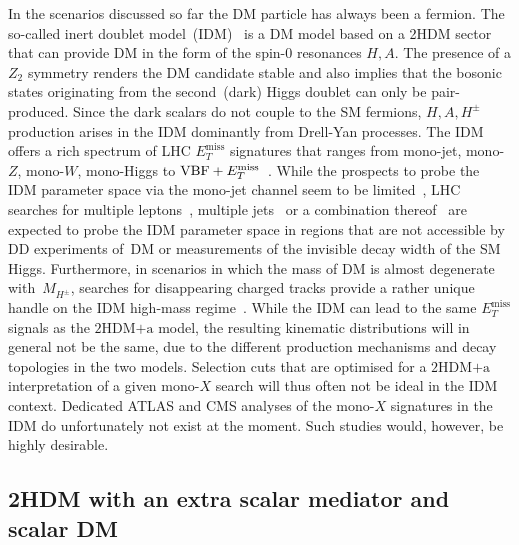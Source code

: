 \documentclass[a4paper, 11pt,notoc]{article}
\newcommand{\MET}{\ensuremath{E_T^\mathrm{miss}}\xspace}
\newcommand{\hdma}{\ensuremath{\textrm{2HDM+a}}\xspace}
\begin{document}
In the scenarios discussed so far the DM particle has always been a fermion. The so-called inert doublet model~(IDM)~\cite{Deshpande:1977rw,Barbieri:2006dq,Cao:2007rm} is a DM model based on a 2HDM sector that can provide DM in the form of the spin-0 resonances $H, A$.  The presence of a $Z_2$ symmetry renders the DM candidate stable and also implies  that the bosonic states originating from the second~(dark) Higgs doublet can only be pair-produced. Since the dark scalars do not couple to the SM fermions, $H,A,H^\pm$ production arises in the IDM dominantly from Drell-Yan processes. The IDM offers a rich spectrum of LHC $\MET$ signatures that ranges from mono-jet, mono-$Z$, mono-$W$, mono-Higgs to  ${\rm VBF}+\MET$~\cite{Dolle:2009ft,Miao:2010rg,Gustafsson:2012aj,Belanger:2015kga,Ilnicka:2015jba,Poulose:2016lvz,Datta:2016nfz,Hashemi:2016wup,deFlorian:2016spz,Belyaev:2016lok,Dutta:2017lny,Wan:2018eaz}.  While the prospects to probe the IDM parameter space via the mono-jet channel seem to be limited~\cite{Belyaev:2016lok}, LHC searches for multiple leptons~\cite{Dolle:2009ft,Miao:2010rg,Gustafsson:2012aj,Belanger:2015kga,Datta:2016nfz,Hashemi:2016wup}, multiple jets~\cite{Poulose:2016lvz,Dutta:2017lny}  or a combination thereof~\cite{Hashemi:2016wup,Wan:2018eaz} are expected to probe the IDM parameter space in regions that are not accessible by DD experiments of~DM or measurements of the invisible decay width of the SM Higgs. Furthermore, in scenarios in which the mass of DM is almost degenerate with~$M_{H^\pm}$, searches for disappearing charged tracks provide a rather unique handle on the IDM high-mass regime~\cite{Belyaev:2016lok}. While the IDM can lead to the same $\MET$ signals  as the \hdma model, the resulting kinematic distributions will in general not be the same, due to the different production mechanisms and decay topologies in the two models. Selection cuts that are optimised for a \hdma interpretation of a given mono-$X$ search will thus often not be ideal in the IDM context. Dedicated ATLAS and CMS  analyses of the mono-$X$ signatures in the IDM do unfortunately not exist at the moment. Such studies would, however, be highly desirable.

\subsection{2HDM with an extra scalar mediator and scalar DM}
\end{document}
